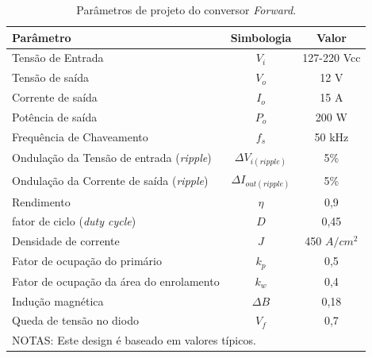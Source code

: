 \begin{table}[H]
    \centering
    \footnotesize
    \caption{Parâmetros de projeto do conversor \textit{Forward}.}
    \label{Conversor_cc/cc1}
    \begin{adjustbox}{max width = \textwidth}
        \begin{tabular}{|l|c|c|}
            \hline
            \rowcolor[HTML]{A8DADC}
            \textbf{Parâmetro} & \textbf{Simbologia} & \textbf{Valor}  \\ \hline
            Tensão de Entrada & $V_{i}$ & 127-220 Vcc
            \\ \hline
            Tensão de saída & $V_{o}$ & 12 V
            \\ \hline
            Corrente de saída & $I_{o}$ & 15 A
            \\ \hline
              Potência de saída & $P_{o}$ & 200 W 
             \\ \hline
              Frequência de Chaveamento & $f_{s}$ & 50 kHz
             \\ \hline
               Ondulação da Tensão de entrada (\textit{ripple}) & $\Delta V_{i(ripple)}$ & 5\%
             \\ \hline
                Ondulação da Corrente de saída (\textit{ripple}) & $\Delta I_{out(ripple)}$ & 5\%
             \\ \hline
                Rendimento & $\eta$ & 0,9
             \\ \hline
                fator de ciclo (\textit{duty cycle}) & $D$ & 0,45
             \\ \hline
                Densidade de corrente & $J$ & 450 $A/cm^{2}$
             \\ \hline
                 Fator de ocupação do primário & $k_{p}$ & 0,5
             \\ \hline
                 Fator de ocupação da área do enrolamento & $k_{w}$ & 0,4
             \\ \hline
                 Indução magnética & $\Delta B$ & 0,18
             \\ \hline
                  Queda de tensão no diodo & $V_{f}$ & 0,7
             \\ \hline
             \multicolumn{3}{l}{NOTAS: Este design é baseado em valores típicos.} \\ 
        \end{tabular}
    \end{adjustbox}
\end{table}

